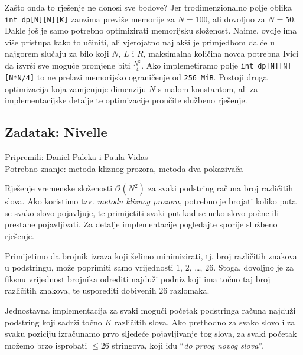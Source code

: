 \documentclass[a4paper]{article}
\begin{document}
Zašto onda to rješenje ne donosi sve bodove? Jer trodimenzionalno polje oblika
\texttt{int dp[N][N][K]} zauzima previše memorije za $N = 100$, ali dovoljno za
$N = 50$.  Dakle još je samo potrebno optimizirati memorijsku složenost. Naime,
ovdje ima više pristupa kako to učiniti, ali vjerojatno najlakši je primjedbom
da će u najgorem slučaju za bilo koji $N$, $L$ i $R$, maksimalna količina novca
potrebna Ivici da izvrši sve moguće promjene biti $\frac{N^2}{4}$. Ako
implemetiramo polje \texttt{int dp[N][N][N*N/4]} to ne prelazi memorijsko
ograničenje od \texttt{256 MiB}. Postoji druga optimizacija koja zamjenjuje
dimenziju $N$ s malom konstantom, ali za implementacijske detalje te
optimizacije proučite službeno rješenje.

\subsection*{Zadatak: Nivelle}
\textsf{Pripremili: Daniel Paleka i Paula Vidas}\\
\textsf{Potrebno znanje: metoda kliznog prozora, metoda dva pokazivača}

Rješenje vremenske složenosti $\mathcal{O}(N^2)$ za svaki podstring računa broj
različitih slova. Ako koristimo tzv. \textit{metodu kliznog prozora}, potrebno
je brojati koliko puta se svako slovo pojavljuje, te primijetiti svaki put kad
se neko slovo počne ili prestane pojavljivati. Za detalje implementacije
pogledajte sporije službeno rješenje.

Primijetimo da brojnik izraza koji želimo minimizirati, tj. broj različitih
znakova u podstringu, može poprimiti samo vrijednosti $1$, $2$, \dots, $26$.
Stoga, dovoljno je za fiksnu vrijednost brojnika odrediti najduži podniz koji
ima točno taj broj različitih znakova, te usporediti dobivenih $26$ razlomaka.

Jednostavna implementacija za svaki mogući početak podstringa računa najduži
podstring koji sadrži točno $K$ različitih slova. Ako prethodno za svako slovo
i za svaku poziciju izračunamo prvo sljedeće pojavljivanje tog slova, za svaki
početak možemo brzo isprobati $\le 26$ stringova, koji idu “\textit{do prvog
novog slova}”.
\end{document}
